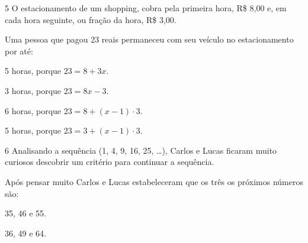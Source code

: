 \begin{escolha}
\begin{escolha}
\begin{escolha}
\begin{escolha}
{\begin{boxmedio}
\begin{boxpeq}
\begin{q°}
\begin{boxmedio}
\begin{boxpeq}
\begin{boxpeq}
\begin{boxmedio}
\begin{boxmedio}
\begin{boxmedio}
\begin{largebox}
\begin{boxmedio}
\num{5} O estacionamento de um shopping, cobra pela primeira hora, R\$ 8,00 e, em cada hora seguinte,
ou fração da hora, R\$ 3,00.

Uma pessoa que pagou 23 reais permaneceu com seu veículo no estacionamento por até:

\begin{escolha}
  
  \item 5 horas, porque $23 = 8 + 3x$.

  \item 3 horas, porque $23 = 8x - 3$.

  \item 6 horas, porque $23 = 8 + (x - 1) \cdot 3$.

  \item 5 horas, porque $23 = 3 + (x - 1) \cdot 3$.

\end{escolha}


\num{6} Analisando a sequência (1, 4, 9, 16, 25, \ldots{}), Carlos e Lucas 
ficaram muito curiosos descobrir um critério para continuar a sequência.

Após pensar muito Carlos e Lucas estabeleceram que os três os próximos
números são:

\begin{escolha}

  \item 35, 46 e 55.

  \item 36, 49 e 64.


\end{escolha}
\end{boxmedio}
\end{largebox}
\end{boxmedio}
\end{boxmedio}
\end{boxmedio}
\end{boxpeq}
\end{boxpeq}
\end{boxmedio}
\end{q°}
\end{boxpeq}
\end{boxmedio}}
\end{escolha}
\end{escolha}
\end{escolha}
\end{escolha}
